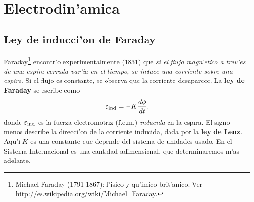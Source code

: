 \chapter{Electrodin'amica}

\section{Ley de inducci'on de Faraday}

Faraday\footnote{Michael Faraday (1791-1867): f'isico y qu'imico brit'anico. Ver \url{http://es.wikipedia.org/wiki/Michael_Faraday}.} encontr'o experimentalmente (1831) que \textit{si el flujo magn'etico a trav'es de una espira cerrada var'ia en el tiempo, se induce una corriente sobre una espira}. Si el flujo es constante, se observa que la corriente desaparece. La \textbf{ley de Faraday} se escribe como
\begin{equation}\label{faraday}
\varepsilon_{\rm ind}=-K\frac{d\phi}{dt},
\end{equation}
donde $\varepsilon_{\rm ind}$ es la fuerza electromotriz (f.e.m.) \textit{inducida} en la espira. El signo menos describe la direcci'on de la corriente inducida, dada por la \textbf{ley de Lenz}. Aqu'i $K$ es una constante que depende del sistema de unidades usado. En el Sistema Internacional es una cantidad adimensional, que determinaremos m'as adelante.

